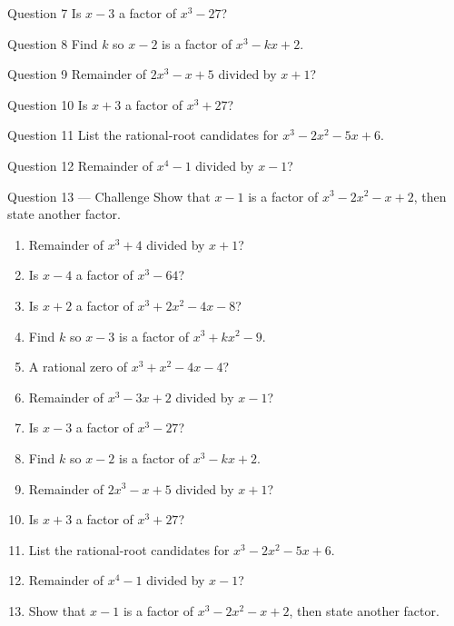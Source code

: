 \documentclass[11pt]{article}
\begin{document}
\begin{qbox}{Question 7}
Is $x-3$ a factor of $x^3-27$?\workspace{2.4cm}
\end{qbox}

\begin{qbox}{Question 8}
Find $k$ so $x-2$ is a factor of $x^3-kx+2$.\workspace{2.4cm}
\end{qbox}

\begin{qbox}{Question 9}
Remainder of $2x^3-x+5$ divided by $x+1$?\workspace{2.4cm}
\end{qbox}

\begin{qbox}{Question 10}
Is $x+3$ a factor of $x^3+27$?\workspace{2.4cm}
\end{qbox}

\begin{qbox}{Question 11}
List the rational-root candidates for $x^3-2x^2-5x+6$.\workspace{2.4cm}
\end{qbox}

\begin{qbox}{Question 12}
Remainder of $x^4-1$ divided by $x-1$?\workspace{2.4cm}
\end{qbox}

\begin{qbox}{Question 13 --- Challenge}
Show that $x-1$ is a factor of $x^3-2x^2-x+2$, then state another factor.\workspace{3.5cm}
\end{qbox}

\clearpage
{}

\begin{recapbox}
\begin{multicols}{2}
\small
\begin{enumerate}[leftmargin=*,itemsep=3pt]
  \item Remainder of $x^3+4$ divided by $x+1$?
  \item Is $x-4$ a factor of $x^3-64$?
  \item Is $x+2$ a factor of $x^3+2x^2-4x-8$?
  \item Find $k$ so $x-3$ is a factor of $x^3+kx^2-9$.
  \item A rational zero of $x^3+x^2-4x-4$?
  \item Remainder of $x^3-3x+2$ divided by $x-1$?
  \item Is $x-3$ a factor of $x^3-27$?
  \item Find $k$ so $x-2$ is a factor of $x^3-kx+2$.
  \item Remainder of $2x^3-x+5$ divided by $x+1$?
  \item Is $x+3$ a factor of $x^3+27$?
  \item List the rational-root candidates for $x^3-2x^2-5x+6$.
  \item Remainder of $x^4-1$ divided by $x-1$?
  \item Show that $x-1$ is a factor of $x^3-2x^2-x+2$, then state another factor.
\end{enumerate}
\end{multicols}
\end{recapbox}
\end{document}
